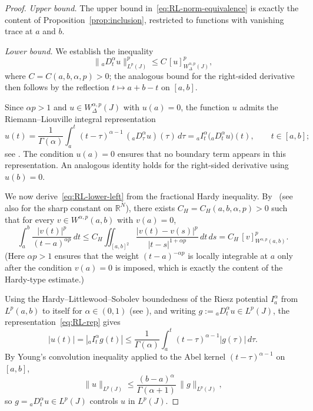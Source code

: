 \documentclass[11pt,a4paper]{article}
\numberwithin{equation}{section}
\theoremstyle{definition}
\newcommand{\R}{\mathbb{R}}
\begin{document}
\begin{proof}[Proof]
\textit{Upper bound.}
The upper bound in~\eqref{eq:RL-norm-equivalence} is exactly the
content of Proposition~\ref{prop:inclusion}, restricted to functions
with vanishing trace at $a$ and $b$.

\smallskip
\noindent\textit{Lower bound.}
We establish the inequality
\begin{equation}\label{eq:RL-lower-left}
\|{}_a D^\alpha_t u\|^p_{L^p(J)}
\le C\,[u]^p_{W^{\alpha,p}_\Delta(J)},
\end{equation}
where $C=C(a,b,\alpha,p)>0$; the analogous bound for the right-sided
derivative then follows by the reflection $t\mapsto a+b-t$ on $[a,b]$.

Since $\alpha p>1$ and $u\in W^{\alpha,p}_\Delta(J)$ with $u(a)=0$,
the function $u$ admits the Riemann--Liouville integral representation
\begin{equation}\label{eq:RL-rep}
u(t)
= \frac{1}{\Gamma(\alpha)}
  \int_a^t (t-\tau)^{\alpha-1}\,({}_aD^\alpha_\tau u)(\tau)\,d\tau
= {}_aI^\alpha_t\bigl({}_aD^\alpha_t u\bigr)(t),
\qquad t\in[a,b];
\end{equation}
see \cite[Chapter~2, \S13, Theorem~13.1]{SamkoKilbasMarichev1993}.
The condition $u(a)=0$ ensures that no boundary term appears in this
representation. An analogous identity holds for the right-sided
derivative using $u(b)=0$.

We now derive~\eqref{eq:RL-lower-left} from the fractional Hardy
inequality. By~\cite[Theorem~1]{Dyda2004} (see also
\cite[Theorem~1.1]{FrankSeiringer2008} for the sharp constant on
$\R^N$), there exists $C_H=C_H(a,b,\alpha,p)>0$ such that for every
$v\in W^{\alpha,p}(a,b)$ with $v(a)=0$,
\begin{equation}\label{eq:hardy-endpoint}
\int_a^b \frac{|v(t)|^p}{(t-a)^{\alpha p}}\,dt
\le C_H\iint_{[a,b]^2}
\frac{|v(t)-v(s)|^p}{|t-s|^{1+\alpha p}}\,dt\,ds
= C_H\,[v]^p_{W^{\alpha,p}(a,b)}.
\end{equation}
(Here $\alpha p>1$ ensures that the weight $(t-a)^{-\alpha p}$ is
locally integrable at $a$ only after the condition $v(a)=0$ is
imposed, which is exactly the content of the Hardy-type estimate.)

Using the Hardy--Littlewood--Sobolev boundedness of the Riesz
potential $I^\alpha_a$ from $L^p(a,b)$ to itself for
$\alpha\in(0,1)$ (see \cite[Chapter~1, \S5]{SamkoKilbasMarichev1993}),
and writing $g:={}_aD^\alpha_t u\in L^p(J)$, the
representation~\eqref{eq:RL-rep} gives
\[
|u(t)| = |{}_aI^\alpha_t g(t)|
\le \frac{1}{\Gamma(\alpha)}\int_a^t (t-\tau)^{\alpha-1}|g(\tau)|\,d\tau.
\]
By Young's convolution inequality applied to the Abel kernel
$(t-\tau)^{\alpha-1}$ on $[a,b]$,
\[
\|u\|_{L^p(J)}\le \frac{(b-a)^{\alpha}}{\Gamma(\alpha+1)}\,\|g\|_{L^p(J)},
\]
so $g={}_aD^\alpha_t u\in L^p(J)$ controls $u$ in $L^p(J)$.


\end{proof}
\end{document}
